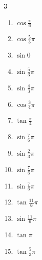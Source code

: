 \begin{multicols}{3}
\begin{enumerate}
  \item $\displaystyle \cos{\frac{\pi}{6}}$

  \item $\displaystyle \cos{\frac{5}{3}\pi}$

  \item $\displaystyle \sin{0}$
        \phantom{$\displaystyle =0$}

  \item $\displaystyle \sin{\frac{5}{3}\pi}$

  \item $\displaystyle \sin{\frac{4}{3}\pi}$

  \item $\displaystyle \cos{\frac{3}{4}\pi}$

  \item $\displaystyle \tan{\frac{\pi}{4}}$
        \phantom{$\displaystyle =1$}

  \item $\displaystyle \sin{\frac{7}{6}\pi}$

  \item $\displaystyle \sin{\frac{2}{3}\pi}$

  \item $\displaystyle \sin{\frac{7}{6}\pi}$

  \item $\displaystyle \sin{\frac{7}{6}\pi}$

  \item $\displaystyle \tan{\frac{11}{6}\pi}$

\columnbreak %

\resetques

  \item $\displaystyle \sin{\frac{11}{6}\pi}$

  \item $\displaystyle \tan{\pi}$
        \phantom{$\displaystyle =0$}

  \item $\displaystyle \tan{\frac{5}{3}\pi}$


\end{enumerate}
\end{multicols}
